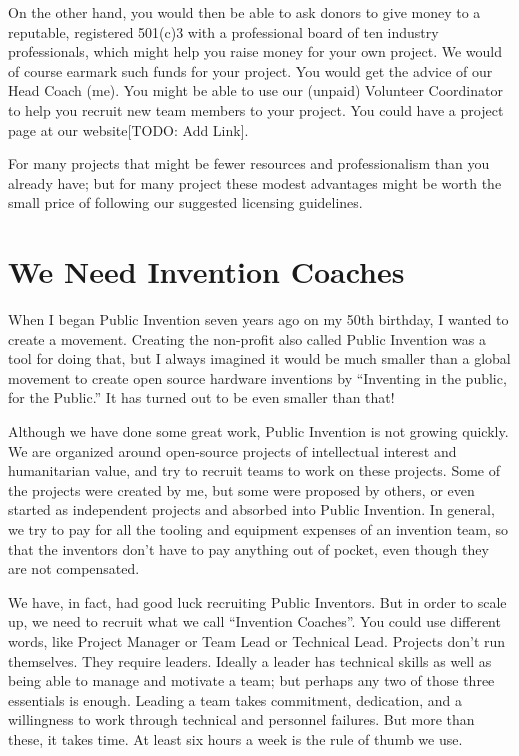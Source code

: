 \documentclass[
	fontsize=10pt, %
	twoside=false, %
	secnumdepth=1, %
]{kaobook}
\begin{document}
On the other hand, you would then be able to ask donors to give money to a reputable, registered 501(c)3 with a professional board of ten industry
professionals, which might help you raise money for your own project. We would of course earmark such funds for your project.
You would get the advice of our Head Coach (me). You might be able to use our (unpaid) Volunteer Coordinator to help you recruit new team members to your project.
You could have a project page at our website[TODO: Add Link].

For many projects that might be fewer resources and professionalism than you already have;
but for many project these modest advantages might be worth the small price of following
our suggested licensing guidelines.


\chapter{We Need Invention Coaches}

When I began Public Invention seven years ago on my 50th birthday, I
wanted to create a movement. Creating the non-profit also called
Public Invention was a tool for doing that, but I always imagined it
would be much smaller than a global movement to create open source
hardware inventions by “Inventing in the public, for the Public.” It
has turned out to be even smaller than that!

Although we have done some great work, Public Invention is not growing
quickly. We are organized around open-source projects of intellectual
interest and humanitarian value, and try to recruit teams to work on
these projects. Some of the projects were created by me, but some were
proposed by others, or even started as independent projects and
absorbed into Public Invention. In general, we try to pay for all the
tooling and equipment expenses of an invention team, so that the
inventors don’t have to pay anything out of pocket, even though they
are not compensated.

We have, in fact, had good luck recruiting Public Inventors. But in
order to scale up, we need to recruit what we call “Invention
Coaches”. You could use different words, like Project Manager or Team
Lead or Technical Lead. Projects don’t run themselves. They require
leaders. Ideally a leader has technical skills as well as being able
to manage and motivate a team; but perhaps any two of those three
essentials is enough. Leading a team takes commitment, dedication, and
a willingness to work through technical and personnel failures. But
more than these, it takes time. At least six hours a week is the rule
of thumb we use.
\end{document}
